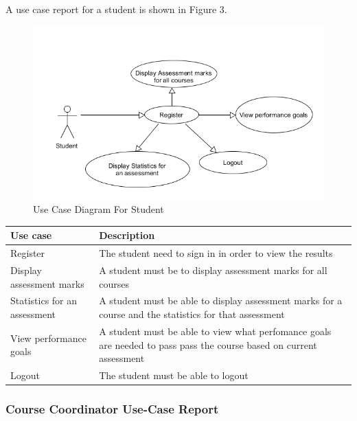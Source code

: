 \documentclass[10pt,onecolumn]{RequimentsGathering}
\begin{document}
	A use case report for a student is shown in Figure 3.
	\begin{center}
		\begin{figure}[h]
			\centering
			\includegraphics[trim={0cm 0cm 0cm 0cm },clip,scale = 1.1]{StudentUsecase}
			\caption{Use Case Diagram For Student}
		\end{figure}
	\end{center}
	
	
	
	\begin{center}
		\begin{tabular}{ | p{3cm} | p{10cm}| }
			\hline
			\textbf{Use case}& \textbf{Description} \\ \hline
			Register & The student need to sign in in order to view the results \\ \hline
			Display assessment marks & A student must be to display assessment marks for all courses  \\ \hline
			Statistics for an assessment & A student must be able to display assessment marks for a course and the statistics for that assessment \\ \hline
			View performance goals & A student must be able to view what perfomance goals are needed to pass pass the course based on current assessment \\ \hline
			Logout          & The student must be able to logout  \\ \hline
			
		\end{tabular}
	\end{center}
	\clearpage
	\subsubsection{Course Coordinator Use-Case Report}$\;\;\;\;\;\;\;\;\;\;\;\;\;\;\;\;\;\;\;\;\;\;\;$
	
\end{document}
